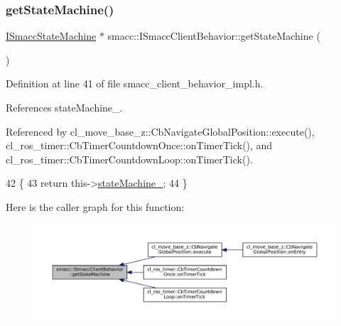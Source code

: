 \subsubsection{\texorpdfstring{get\+State\+Machine()}{getStateMachine()}}
{\footnotesize\ttfamily \hyperlink{classsmacc_1_1ISmaccStateMachine}{I\+Smacc\+State\+Machine} $\ast$ smacc\+::\+I\+Smacc\+Client\+Behavior\+::get\+State\+Machine (\begin{DoxyParamCaption}{ }\end{DoxyParamCaption})\hspace{0.3cm}{\ttfamily [inline]}}



Definition at line 41 of file smacc\+\_\+client\+\_\+behavior\+\_\+impl.\+h.



References state\+Machine\+\_\+.



Referenced by cl\+\_\+move\+\_\+base\+\_\+z\+::\+Cb\+Navigate\+Global\+Position\+::execute(), cl\+\_\+ros\+\_\+timer\+::\+Cb\+Timer\+Countdown\+Once\+::on\+Timer\+Tick(), and cl\+\_\+ros\+\_\+timer\+::\+Cb\+Timer\+Countdown\+Loop\+::on\+Timer\+Tick().


\begin{DoxyCode}
42 \{
43     \textcolor{keywordflow}{return} this->\hyperlink{classsmacc_1_1ISmaccClientBehavior_a0fea65db292a8bb3dfba3e5840491d79}{stateMachine\_};
44 \}
\end{DoxyCode}
Here is the caller graph for this function\+:
\nopagebreak
\begin{figure}[H]
\begin{center}
\leavevmode
\includegraphics[width=350pt]{classsmacc_1_1ISmaccClientBehavior_a9d55a85bf0a920033805a3c050de2019_icgraph}
\end{center}
\end{figure}
\mbox{\label{classsmacc_1_1ISmaccClientBehavior_af1cfb6b9846e6ced881ee4cd514e1553}} 
